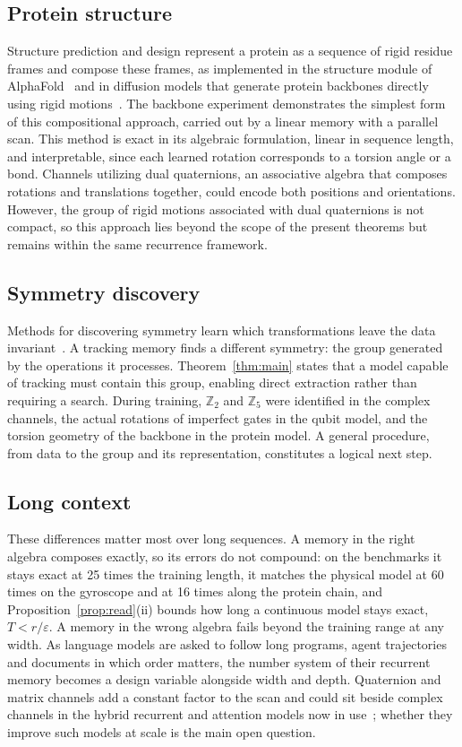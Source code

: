 \documentclass[aps,prx,reprint,superscriptaddress,longbibliography,nofootinbib,floatfix]{revtex4-2}
\newcommand{\ZZ}{\mathbb{Z}}
\theoremstyle{plain}
\theoremstyle{definition}
\begin{document}
\subsection{Protein structure}
Structure prediction and design represent
a protein as a sequence of rigid residue frames and compose these frames, as implemented in the
structure module of AlphaFold~\cite{alphafold} and in diffusion models that
generate protein backbones directly using rigid motions~\cite{yim_framediff,rfdiffusion}.
The backbone experiment demonstrates the simplest form of this compositional approach, carried
out by a linear memory with a parallel scan. This method is exact in its algebraic formulation, linear in
sequence length, and interpretable, since each learned rotation corresponds to a torsion angle or a bond.
Channels utilizing dual quaternions, an associative algebra that composes
rotations and translations together, could encode both positions and
orientations. However, the group of rigid motions associated with dual quaternions is not compact, so this approach lies
beyond the scope of the present theorems but remains within the same recurrence framework.



\subsection{Symmetry discovery}
Methods for discovering symmetry learn
which transformations leave the data invariant~\cite{benton,yang_gan}. A
tracking memory finds a different symmetry: the group generated by the
operations it processes. Theorem~\ref{thm:main} states that a model capable of tracking must contain this group, enabling direct extraction rather than requiring a search. During training, $\ZZ_2$ and $\ZZ_5$ were identified in the complex channels, the actual rotations of imperfect gates in the qubit model, and the torsion geometry of the backbone in the protein model. A general procedure, from
data to the group and its representation, constitutes a logical next step.


\subsection{Long context}
These differences matter most over long sequences. A memory in the right algebra composes exactly, so its errors do not compound: on the benchmarks it stays exact at 25 times the training length, it matches the physical model at 60 times on the gyroscope and at 16 times along the protein chain, and Proposition~\ref{prop:read}(ii) bounds how long a continuous model stays exact, $T<r/\varepsilon$. A memory in the wrong algebra fails beyond the training range at any width. As language models are asked to follow long programs, agent trajectories and documents in which
order matters, the number system of their recurrent memory becomes a design
variable alongside width and depth. Quaternion and matrix channels add a
constant factor to the scan and could sit beside complex channels in the
hybrid recurrent and attention models now in use~\cite{griffin,jamba};
whether they improve such models at scale is the main open question.
\end{document}
